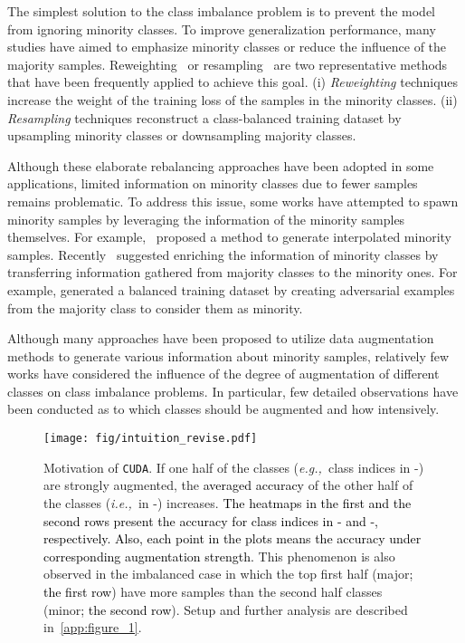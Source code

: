 \documentclass{article}
\newcommand{\eg}{\emph{e.g.,~}}
\newcommand{\ie}{\emph{i.e.,~}}
\def\code#1{\texttt{#1}}
\newcommand{\alg}{\code{CUDA}\xspace}
\renewcommand*\cite[1]{\citep{#1}}
\newcommand{\rebut}[1]{\textcolor{black}{#1}}
\begin{document}
The simplest solution to the class imbalance problem is to prevent the model from ignoring minority classes. To improve generalization performance, many studies have aimed to emphasize minority classes or reduce the influence of the majority samples. Reweighting~\cite{cao2019learning, menon2021longtail} or resampling~\cite{buda2018systematic, van2007experimental} are two representative methods that have been frequently applied to achieve this goal. (i) \emph{Reweighting} techniques increase the weight of the training loss of the samples in the minority classes. (ii) \emph{Resampling} techniques reconstruct a class-balanced training dataset by upsampling minority classes or downsampling majority classes. 

Although these elaborate rebalancing approaches have been adopted in some applications, limited information on minority classes due to fewer samples remains problematic. To address this issue, some works have attempted to spawn minority samples by leveraging the information of the minority samples themselves. For example,~\citet{chawla2002smote, ando2017deep} proposed a method to generate interpolated minority samples. Recently~\cite{kim2020m2m, chu2020feature, park2022majority} suggested enriching the information of minority classes by transferring information gathered from majority classes to the minority ones. For example, \citet{kim2020m2m} generated a balanced training dataset by creating adversarial examples from the majority class to consider them as minority.

Although many approaches have been proposed to utilize data augmentation methods to generate various information about minority samples, relatively few works have considered the influence of the degree of augmentation of different classes on class imbalance problems. In particular, few detailed observations have been conducted as to which classes should be augmented and how intensively.

\begin{figure*}[t]
    \centering
    \vspace{-10pt}
\texttt{[image: fig/intuition\_revise.pdf]}
    \vspace{-5pt}
    \caption{Motivation of \alg.
    If one half of the classes (\eg class indices in -) are strongly augmented, the \rebut{averaged accuracy} of the other half of the classes (\ie in -) increases. \rebut{The heatmaps in the first and the second rows present the accuracy for class indices in - and -, respectively. Also, each point in the plots means the accuracy under corresponding augmentation strength.} This phenomenon is also observed in the imbalanced case in which the top first half (major\rebut{; the first row}) have more samples than the second half classes (minor\rebut{; the second row}). Setup and further analysis are described in~\autoref{app:figure_1}.}
    \vspace{-20pt}
    \label{fig:intuition}
\end{figure*}
\end{document}
